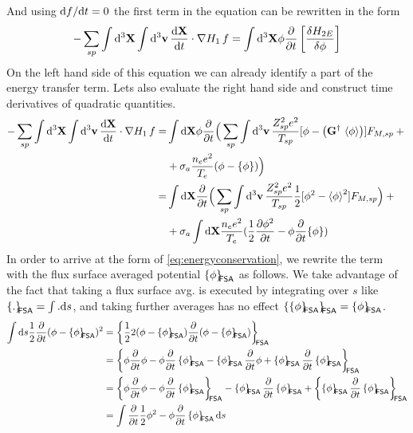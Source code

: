 And using ${\rm d} f / {\rm d} t = 0$ the first term in the equation can be rewritten in the form 
\begin{equation} 
- \sum_{sp}\int {\rm d}^3 {\bf X} \int {\rm d}^3 {\bf v} \, \frac{\mathrm{d} \bf X}{\mathrm{d} t} \cdot \nabla H_1\, f  
= \int{\rm d}^3 {\bf X} \phi \frac{\partial }{\partial  t} \left [ \frac{\delta H_{2E}}{\delta \phi} \right ] 
\label{eq:energyconsPoisson}
\end{equation} 
On the left hand side of this equation we can already identify a part of the energy transfer term.
Lets also evaluate the right hand side and construct time derivatives of quadratic quantities.
\begin{align}
- \sum_{sp}\int {\rm d}^3 {\bf X} \int {\rm d}^3 {\bf v} \, \frac{\mathrm{d} \bf X}{\mathrm{d} t} \cdot \nabla H_1\, f  
= &
\int\mathrm{d}\mathbf{X}
\phi \frac{\partial }{\partial  t}
\Big(
\sum_{sp}
 \int {\rm d}^3 {\bf v} \, \frac{Z_{sp}^2 e^2}{T_{sp}} [ \phi - \left(\mathbf{G}^\dagger\, \left\langle \phi\right\rangle\right) ] F_{M,sp}+{} \nonumber\\
&{}+ \sigma_a \frac{n_e e^2 }{ T_e} (\phi - \{ \phi \} ) 
\Big)\\
=& 
\int\mathrm{d}\mathbf{X}
\frac{\partial }{\partial  t}
\Big(
\sum_{sp}
 \int {\rm d}^3 {\bf v} \, \frac{Z_{sp}^2 e^2}{T_{sp}} \frac{1}{2}[ \phi^2 - \left\langle \phi\right\rangle^2 ] F_{M,sp}
\Big)
+{} \nonumber\\
&{}+ \sigma_a \int\mathrm{d}\mathbf{X}\frac{n_e e^2 }{ T_e} (\frac{1}{2}\frac{\partial \phi^2}{\partial t} - \phi\frac{\partial }{\partial t}\{ \phi \} ) 
\end{align} 
In order to arrive at the form of \eqref{eq:energyconservation}, we
rewrite the term with the flux surface averaged potential $\left\{ \phi\right\}_{\!\!\text{\textsf{FSA}}}$
as follows. We take advantage of the fact that taking a flux surface avg. is executed by
integrating over $s$ like $\left\{ .\right\}_{\!\!\text{\textsf{FSA}}} = \int . \mathrm{d} s$, and taking further averages has no effect $\left\{ \left\{ \phi\right\}_{\!\!\text{\textsf{FSA}}}\right\}_{\!\!\text{\textsf{FSA}}}= \left\{ \phi\right\}_{\!\!\text{\textsf{FSA}}}$.
\begin{align}
\int\ud s\frac{1}{2}\pd{}{t}(\phi - \fsa{\phi})^2  
&=\fsa{\frac{1}{2}2(\phi-\fsa{\phi})\pd{}{t}(\phi-\fsa{\phi})}
\\
&=\fsa{\phi\pd{}{t}\phi - \phi\pd{}{t}\fsa{\phi}-\fsa{\phi}\pd{}{t}\phi + \fsa{\phi}\pd{}{t}\fsa{\phi}
}
\\
&=\fsa{\phi\pd{}{t}\phi - \phi\pd{}{t}\fsa{\phi}}
-\fsa{\phi}\pd{}{t}\fsa{\phi} + \fsa{\fsa{\phi}\pd{}{t}\fsa{\phi}}
\\
&=\int \pd{}{t}\frac{1}{2}\phi^2-\phi\pd{}{t}\fsa{\phi} \ud s
\end{align}

